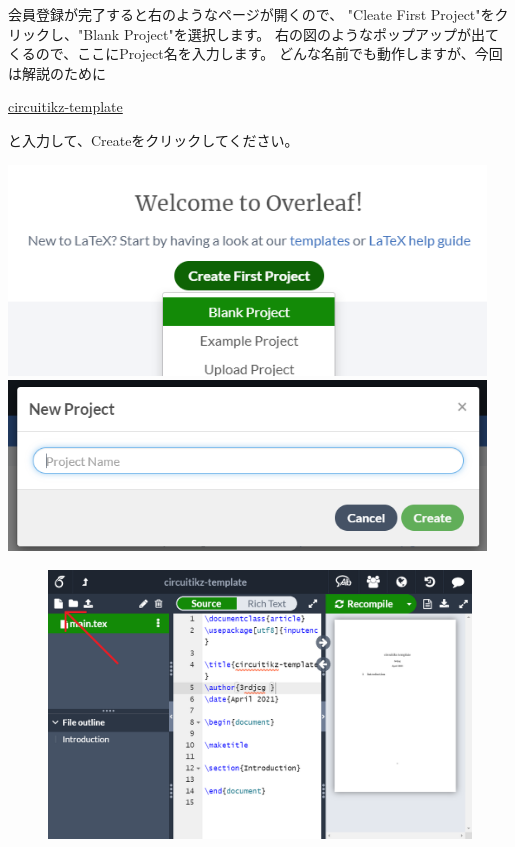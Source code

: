 		\newpage
		\noindent
		\begin{minipage}{0.4\hsize}%
			会員登録が完了すると右のようなページが開くので、
			"Cleate First Project"をクリックし、"Blank Project"を選択します。
			右の図のようなポップアップが出てくるので、ここにProject名を入力します。
			どんな名前でも動作しますが、今回は解説のために
			\begin{mdframed}[style=shadow]
				\url{circuitikz-template}
			\end{mdframed}\vspace{-3mm}
			と入力して、Createをクリックしてください。
		\end{minipage}\hfill
		\begin{minipage}{0.6\hsize}
			\begin{flushright}
				\includegraphics[width=0.95\textwidth]{overleaf-page-createproject.png}\\
				\vspace{3mm}
				\includegraphics[width=0.95\textwidth]{overleaf-page-projectname.png}
			\end{flushright}
		\end{minipage}
		
		\begin{figure}[H]
			\centering
			\includegraphics[width=\textwidth]{overleaf-editer-initial.png}
		\end{figure}
		
